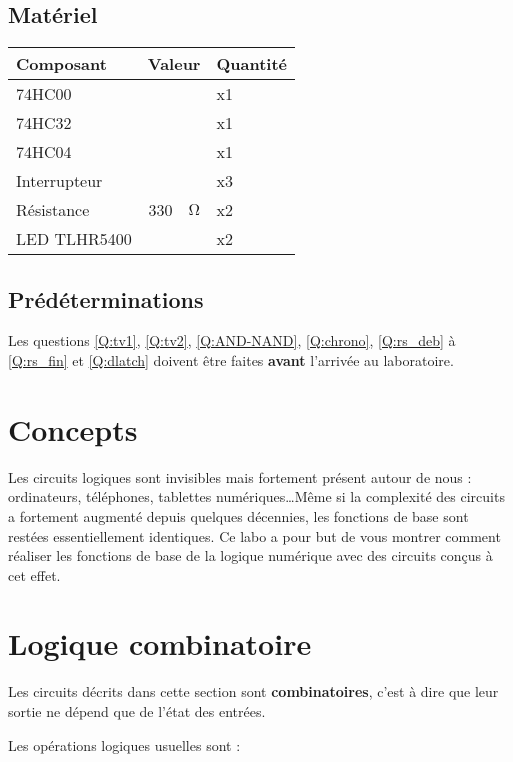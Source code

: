 \documentclass{../template/labo}
\begin{document}
\subsection{Matériel}

\begin{center}
	\begin{tabular}{p{}rlp{}}
		Composant & \multicolumn{2}{c}{Valeur} & Quantité \\\toprule
		\multirow{1}{*}{74HC00} &  & & x1 \\\midrule
		\multirow{1}{*}{74HC32} &  & & x1 \\\midrule
		\multirow{1}{*}{74HC04} &  & & x1 \\\midrule
		\multirow{1}{*}{Interrupteur} 	& & & x3 \\\midrule
		\multirow{1}{*}{Résistance} 	& 330 & $\si{\ohm}$ & x2 \\\midrule
		LED TLHR5400 & & & x2 \\\bottomrule
	\end{tabular}
\end{center}

\subsection{Prédéterminations}
Les questions \ref{Q:tv1}, \ref{Q:tv2}, \ref{Q:AND-NAND}, \ref{Q:chrono}, \ref{Q:rs_deb} à \ref{Q:rs_fin} et \ref{Q:dlatch} doivent être faites \textbf{avant} l'arrivée au laboratoire.

\section{Concepts}

\begin{info}
Les circuits logiques sont invisibles mais fortement présent autour de nous : ordinateurs, téléphones, tablettes numériques\dots Même si la complexité des circuits a fortement augmenté depuis quelques décennies, les fonctions de base sont restées essentiellement identiques. Ce labo a pour but de vous montrer comment réaliser les fonctions de base de la logique numérique avec des circuits conçus à cet effet.
\end{info}

\section{Logique combinatoire}

\begin{info}
Les circuits décrits dans cette section sont \textbf{combinatoires}, c'est à dire que leur sortie ne dépend que de l'état des entrées.

Les opérations logiques usuelles sont :
\end{info}
\end{document}
